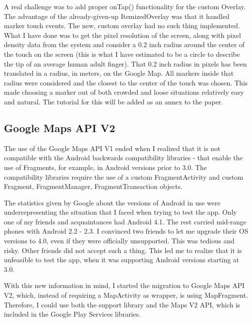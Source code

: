 \documentclass{article}
\begin{document}
A real challenge was to add proper onTap() functionality for the custom Overlay.
The advantage of the already-given-up ItemizedOverlay was that it handled marker
touch events. The new, custom overlay had no such thing implemented. What I have
done was to get the pixel resolution of the screen, along with pixel density
data from the system and consider a 0.2 inch radius around the center of the
touch on the screen (this is what I have estimated to be a circle to describe
the tip of an average human adult finger). That 0.2 inch radius in pixels has
been translated in a radius, in meters, on the Google Map. All markers inside
that radius were considered and the closest to the center of the touch was
chosen. This made choosing a marker out of both crowded and loose situations
relatively easy and natural. The tutorial for this will be added as an annex to
the paper.\newline

\subsection{Google Maps API V2}

The use of the Google Maps API V1 ended when I realized that it is not
compatible with the Android backwards compatibility libraries - that enable the
use of Fragments, for example, in Android versions prior to 3.0. The
compatibility libraries require the use of a custom FragmentActivity and custom
Fragment, FragmentManager, FragmentTransaction objects. \newline

The statistics given by Google about the versions of Android in use were
underrepresenting the situation that I faced when trying to test the app. Only
one of my friends and acquaintances had Android 4.1. The rest carried mid-range
phones with Android 2.2 - 2.3. I convinced two friends to let me upgrade their
OS versions to 4.0, even if they were officially unsupported. This was tedious
and risky. Other friends did not accept such a thing. This led me to realize
that it is unfeasible to test the app, when it was supporting Android versions
starting at 3.0. \newline

With this new information in mind, I started the migration to Google Maps API
V2, which, instead of requiring a MapActivity as wrapper, is using MapFragment.
Therefore, I could use both the support library and the Maps V2 API, which is
included in the Google Play Services libraries.\newline
\end{document}
